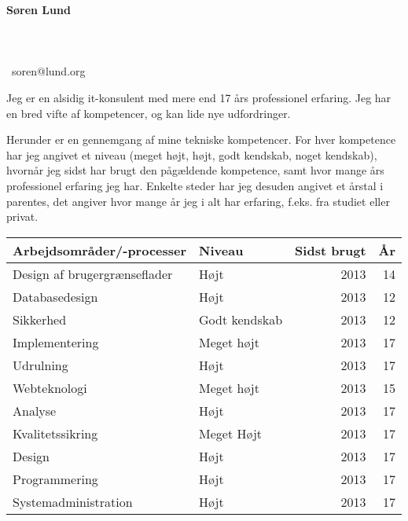 \documentclass[a4paper,11pt]{article}
\newcommand\redacted{[skjult i online version]}
\newcommand\myaddressone{\redacted}
\newcommand\myaddresstwo{\redacted}
\newcommand\myphone{\redacted}
\begin{document}
\centerline{}
\centerline{}

\begin{minipage}[b]{0.30\textwidth}
  \selectfont%
  \textbf{Søren Lund} \\
  \myaddressone \\
  \myaddresstwo \\
  \myphone \\
  \Email\ soren@lund.org
\end{minipage}%
\hfill
\begin{minipage}[b]{0.30\textwidth}
  \selectfont%
  Jeg er en alsidig it-konsulent med
  mere end 17 års professionel
  erfaring. Jeg har en bred vifte af
  kompetencer, og
  kan lide nye udfordringer.
\end{minipage}

\bigskip
\bigskip

Herunder er en gennemgang af mine tekniske kompetencer. For hver
kompetence har jeg angivet et niveau (meget højt, højt, godt kendskab,
noget kendskab), hvornår jeg sidst har brugt den pågældende
kompetence, samt hvor mange års professionel erfaring jeg har. Enkelte
steder har jeg desuden angivet et årstal i parentes, det angiver hvor
mange år jeg i alt har erfaring, f.eks. fra studiet eller privat.

\bigskip
\begin{tabularx}{\textwidth}{X l r r}
  \textbf{Arbejdsområder/-processer} & \textbf{Niveau} & \textbf{Sidst brugt} & \textbf{År} \\
  \hline
  Design af brugergrænseflader      & Højt             & 2013	              & 14 \\
  Databasedesign                    & Højt             & 2013                 & 12 \\
  Sikkerhed                         & Godt kendskab    & 2013                 & 12 \\
  Implementering                    & Meget højt       & 2013                 & 17 \\
  Udrulning                         & Højt             & 2013                 & 17 \\
  Webteknologi                      & Meget højt       & 2013                 & 15 \\
  Analyse                           & Højt             & 2013                 & 17 \\
  Kvalitetssikring                  & Meget Højt       & 2013                 & 17 \\
  Design                            & Højt             & 2013                 & 17 \\
  Programmering                     & Højt             & 2013                 & 17 \\
  Systemadministration              & Højt             & 2013                 & 17 \\
  \hline
\end{tabularx}
\end{document}
